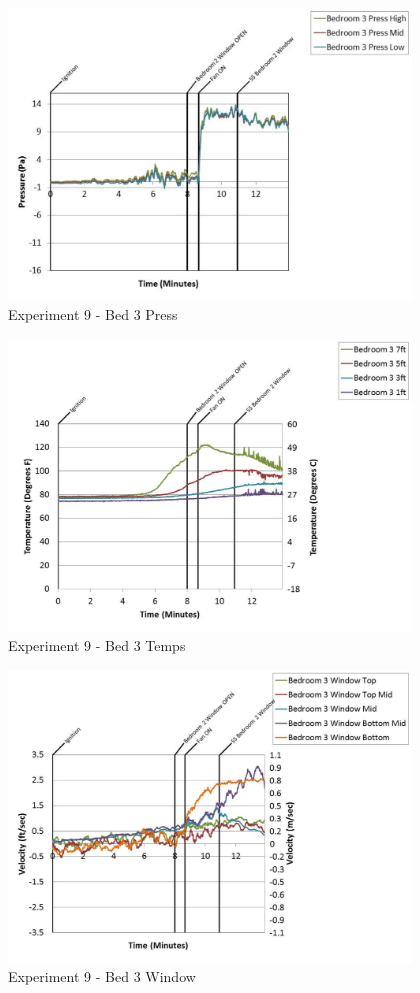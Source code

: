 \documentclass{article}
\begin{document}
\begin{appendices}
	\begin{figure}[h!]
		\centering
		\includegraphics[height=3.05in]{0_Images/Results_Charts/Exp_9_Charts/Bed3Press.pdf}
		\caption{Experiment 9 - Bed 3 Press}
	\end{figure}
 
	\clearpage

	\begin{figure}[h!]
		\centering
		\includegraphics[height=3.05in]{0_Images/Results_Charts/Exp_9_Charts/Bed3Temps.pdf}
		\caption{Experiment 9 - Bed 3 Temps}
	\end{figure}
 

	\begin{figure}[h!]
		\centering
		\includegraphics[height=3.05in]{0_Images/Results_Charts/Exp_9_Charts/Bed3Window.pdf}
		\caption{Experiment 9 - Bed 3 Window}
	\end{figure}
 

\end{appendices}
\end{document}
